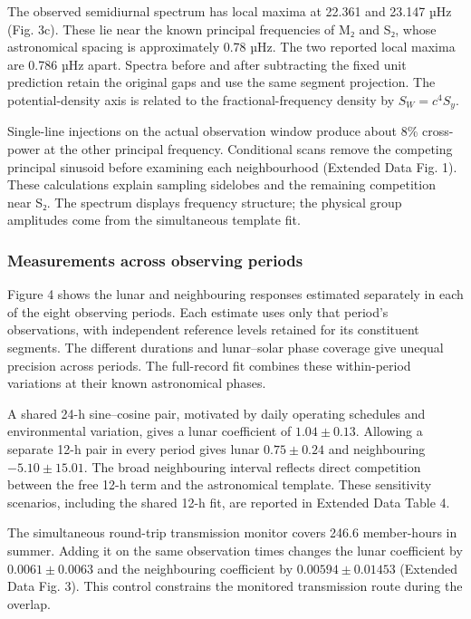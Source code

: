 \documentclass[
  12pt,
  a4paper,
]{article}
\begin{document}
The observed semidiurnal spectrum has local maxima at 22.361 and 23.147
µHz (Fig. 3c). These lie near the known principal frequencies of M₂ and
S₂, whose astronomical spacing is approximately 0.78 µHz. The two
reported local maxima are 0.786 µHz apart. Spectra before and after
subtracting the fixed unit prediction retain the original gaps and use
the same segment projection. The potential-density axis is related to
the fractional-frequency density by \(S_W=c^4S_y\).

Single-line injections on the actual observation window produce about
8\% cross-power at the other principal frequency. Conditional scans
remove the competing principal sinusoid before examining each
neighbourhood (Extended Data Fig. 1). These calculations explain
sampling sidelobes and the remaining competition near S₂. The spectrum
displays frequency structure; the physical group amplitudes come from
the simultaneous template fit.

\hypertarget{measurements-across-observing-periods}{%
\subsubsection{Measurements across observing
periods}\label{measurements-across-observing-periods}}

Figure 4 shows the lunar and neighbouring responses estimated separately
in each of the eight observing periods. Each estimate uses only that
period's observations, with independent reference levels retained for
its constituent segments. The different durations and lunar--solar phase
coverage give unequal precision across periods. The full-record fit
combines these within-period variations at their known astronomical
phases.

A shared 24-h sine--cosine pair, motivated by daily operating schedules
and environmental variation, gives a lunar coefficient of
\(1.04\pm0.13\). Allowing a separate 12-h pair in every period gives
lunar \(0.75\pm0.24\) and neighbouring \(-5.10\pm15.01\). The broad
neighbouring interval reflects direct competition between the free 12-h
term and the astronomical template. These sensitivity scenarios,
including the shared 12-h fit, are reported in Extended Data Table 4.

The simultaneous round-trip transmission monitor covers 246.6
member-hours in summer. Adding it on the same observation times changes
the lunar coefficient by \(0.0061\pm0.0063\) and the neighbouring
coefficient by \(0.00594\pm0.01453\) (Extended Data Fig. 3). This
control constrains the monitored transmission route during the overlap.
\end{document}
